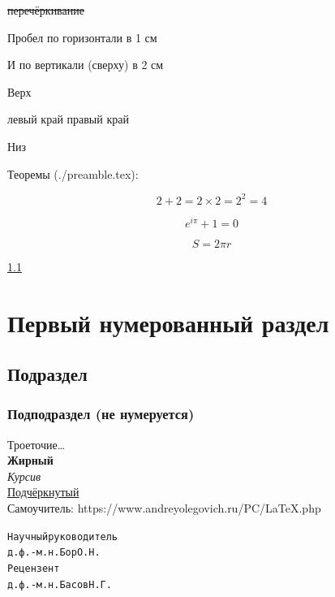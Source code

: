 \st{перечёркивание}


\newpage
Пробел \hspace{1cm} по горизонтали в 1 см

\vspace{2cm}
И по вертикали (сверху) в 2 см

Верх

левый край правый край


Низ

\newpage


Теоремы (./preamble.tex):
\begin{lemma}
  \[ 2 + 2 = 2 \times 2 = 2^2 = 4 \]
\end{lemma}

\begin{theorem}
  \[ e^{i \pi} + 1 = 0 \]
\end{theorem}

\begin{theorem}
  \[ S = 2 \pi r \]
\end{theorem}

\ref{subsect} %

\section{Первый нумерованный раздел}
\subsection{Подраздел}
\label{subsect} %
\subsubsection{Подподраздел (не нумеруется)}

Троеточие\ldots\\
\textbf{Жирный}\\
\textit{Курсив}\\
\underline{Подчёркнутый}\\
Самоучитель: https://www.andreyolegovich.ru/PC/LaTeX.php

\begin{alltt}
  Научный руководитель
  д.ф.-м.н. Бор О.Н.
  Рецензент
  д.ф.-м.н. Басов Н.Г.
\end{alltt}

